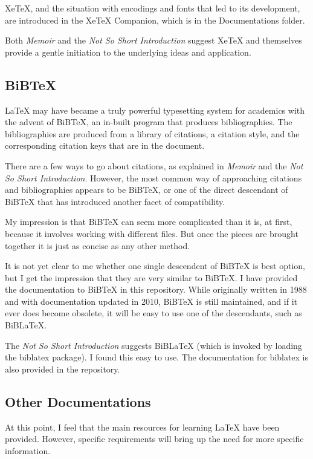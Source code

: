 \documentclass[11pt, oneside]{memoir}
\begin{document}
XeTeX, and the situation with encodings and fonts that led to its development, are introduced in the XeTeX Companion, which is in the Documentations folder.

Both \emph{Memoir} and the \emph{Not So Short Introduction} suggest XeTeX and themselves provide a gentle initiation to the underlying ideas and application.

\subsection{BiBTeX}

LaTeX may have became a truly powerful typesetting system for academics with the advent of BiBTeX, an in-built program that produces bibliographies. The bibliographies are produced from a library of citations, a citation style, and the corresponding citation keys that are in the document.

There are a few ways to go about citations, as explained in \emph{Memoir} and the \emph{Not So Short Introduction}. However, the most common way of approaching citations and bibliographies appears to be BiBTeX, or one of the direct descendant of BiBTeX that has introduced another facet of compatibility.

My impression is that BiBTeX can seem more complicated than it is, at first, because it involves working with different files. But once the pieces are brought together it is just as concise as any other method.

It is not yet clear to me whether one single descendent of BiBTeX is best option, but I get the impression that they are very similar to BiBTeX. I have provided the documentation to BiBTeX in this repository. While originally written in 1988 and with documentation updated in 2010, BiBTeX is still maintained, and if it ever does become obsolete, it will be easy to use one of the descendants, such as BiBLaTeX.

The \emph{Not So Short Introduction} suggests BiBLaTeX (which is invoked by loading the biblatex package). I found this easy to use. The documentation for biblatex is also provided in the repository.

\subsection{Other Documentations}
At this point, I feel that the main resources for learning LaTeX have been provided. However, specific requirements will bring up the need for more specific information. 
\end{document}
